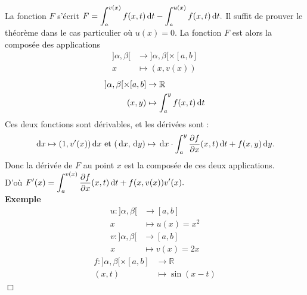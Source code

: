 \documentclass[11pt, a4paper]{book}
\newenvironment{pr}{\noindent {\bf Preuve} \noindent} {\hfill $\Box$\vskip 5mm}
\begin{document}
\begin{pr}\quad
La fonction $F$ s'\'ecrit ${\displaystyle F=\int_a^{v(x)}f(x,t)\,\mathrm{d} t-\int_a^{u(x)}f(x,t)\,\mathrm{d} t}.$ Il suffit de prouver le th\'eor\`eme dans le cas particulier o\`u $u(x)=0$. La fonction $F$ est alors la	compos\'ee des applications \begin{align*}
]\alpha,\beta[&\rightarrow]\alpha,\beta[\times[a,b]\\x&\mapsto (x,v(x))
\end{align*}
\begin{align*}
]\alpha,\beta[\times[a,b]&\rightarrow\mathbb{R}\\(x,y)&\mapsto \int_a^y f(x,t)\,\mathrm{d} t 
\end{align*}
Ces deux fonctions sont d\'erivables, et les d\'eriv\'ees sont : $$\,\mathrm{d} x\mapsto (1,v'(x))\,\mathrm{d} x~\text{et}~(\,\mathrm{d} x,\,\mathrm{d} y)\mapsto \,\mathrm{d} x\cdot\int_a^y\dfrac{\partial f}{\partial x}(x,t)\,\mathrm{d} t +f(x,y) \,\mathrm{d} y.$$ Donc la d\'eriv\'ee de $F$ au point $x$ est la compos\'ee de ces deux applications.\\ D'o\`u ${\displaystyle F'(x)=\int_a^{v(x)} \dfrac{\partial f}{\partial x}(x,t)\,\mathrm{d} t +f(x,v(x))v'(x).}$\\
\textbf{Exemple } \begin{align*}
u:]\alpha,\beta[&\rightarrow[a,b]\\x&\mapsto u(x)=x^2
\end{align*}
\begin{align*}
v:]\alpha,\beta[&\rightarrow[a,b]\\x&\mapsto v(x)=2x
\end{align*}
\begin{align*}
f:]\alpha,\beta[\times[a,b]&\rightarrow\mathbb{R}\\(x,t)&\mapsto\sin(x-t)
\end{align*}
\end{pr}
\end{document}

